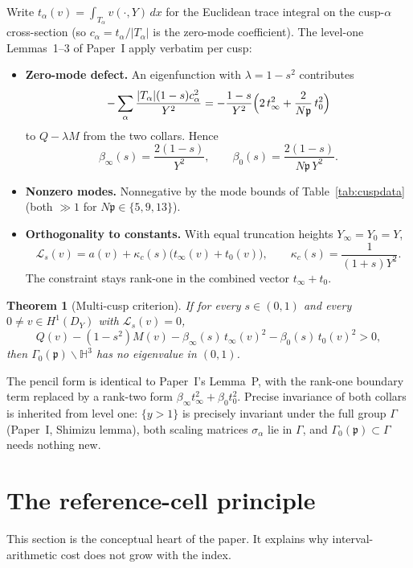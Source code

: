 \documentclass[11pt]{amsart}
\newtheorem{theorem}{Theorem}[section]
\newcommand{\HH}{\mathbb{H}^3}
\newcommand{\p}{\mathfrak{p}}
\begin{document}
Write $t_\alpha(v)=\int_{T_\alpha}v(\cdot,Y)\,dx$ for the Euclidean trace
integral on the cusp-$\alpha$ cross-section (so
$c_\alpha=t_\alpha/|T_\alpha|$ is the zero-mode coefficient).  The
level-one Lemmas~1--3 of Paper~I apply verbatim per cusp:

\begin{itemize}
\item \textbf{Zero-mode defect.}  An eigenfunction with
  $\lambda=1-s^2$ contributes
  \[
    -\sum_\alpha\frac{|T_\alpha|(1-s)c_\alpha^2}{Y^2}
    =-\frac{1-s}{Y^2}\Bigl(2\,t_\infty^2+\frac{2}{N\p}\,t_0^2\Bigr)
  \]
  to $Q-\lambda M$ from the two collars.  Hence
  \[
    \beta_\infty(s)=\frac{2(1-s)}{Y^2},\qquad
    \beta_0(s)=\frac{2(1-s)}{N\p\,Y^2}.
  \]
\item \textbf{Nonzero modes.}  Nonnegative by the mode bounds of
  Table~\ref{tab:cuspdata} (both $\gg 1$ for $N\p\in\{5,9,13\}$).
\item \textbf{Orthogonality to constants.}  With equal truncation heights
  $Y_\infty=Y_0=Y$,
  \[
    \mathcal{L}_s(v)=a(v)+\kappa_c(s)\bigl(t_\infty(v)+t_0(v)\bigr),\qquad
    \kappa_c(s)=\frac{1}{(1+s)Y^2}.
  \]
  The constraint stays rank-one in the combined vector $t_\infty+t_0$.
\end{itemize}

\begin{theorem}[Multi-cusp criterion]\label{thm:multicrit}
If for every $s\in(0,1)$ and every $0\neq v\in H^1(D_Y)$ with
$\mathcal{L}_s(v)=0$,
\[
  Q(v)-(1-s^2)M(v)-\beta_\infty(s)\,t_\infty(v)^2
  -\beta_0(s)\,t_0(v)^2>0,
\]
then $\Gamma_0(\p)\backslash\HH$ has no eigenvalue in $(0,1)$.
\end{theorem}

The pencil form is identical to Paper~I's Lemma~P, with the rank-one
boundary term replaced by a rank-two form
$\beta_\infty t_\infty^2+\beta_0 t_0^2$.  Precise invariance of both
collars is inherited from level one: $\{y>1\}$ is precisely invariant
under the full group $\Gamma$ (Paper~I, Shimizu lemma), both scaling
matrices $\sigma_\alpha$ lie in $\Gamma$, and $\Gamma_0(\p)\subset\Gamma$
needs nothing new.

\section{The reference-cell principle}\label{sec:refcell}

This section is the conceptual heart of the paper.  It explains why
interval-arithmetic cost does not grow with the index.
\end{document}
